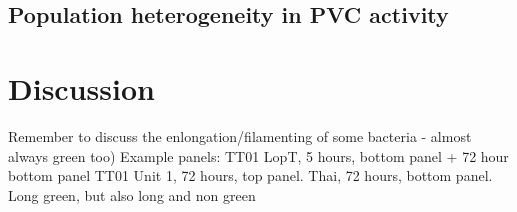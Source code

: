 \subsection{Population heterogeneity in PVC activity}

%


\section{Discussion}
Remember to discuss the enlongation/filamenting of some bacteria - almost always green too)
Example panels:
TT01 LopT, 5 hours, bottom panel + 72 hour bottom panel
TT01 Unit 1, 72 hours, top panel.
Thai, 72 hours, bottom panel. Long green, but also long and non green
